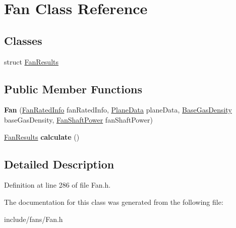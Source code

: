 \hypertarget{class_fan}{}\section{Fan Class Reference}
\label{class_fan}
\subsection*{Classes}
\begin{DoxyCompactItemize}
\item 
struct \hyperlink{struct_fan_1_1_fan_results}{Fan\+Results}
\end{DoxyCompactItemize}
\subsection*{Public Member Functions}
\begin{DoxyCompactItemize}
\item 
\mbox{\label{class_fan_a95fdcf17dfae2f251516b74280b2b18d}} 
{\bfseries Fan} (\hyperlink{class_fan_rated_info}{Fan\+Rated\+Info} fan\+Rated\+Info, \hyperlink{class_plane_data}{Plane\+Data} plane\+Data, \hyperlink{class_base_gas_density}{Base\+Gas\+Density} base\+Gas\+Density, \hyperlink{class_fan_shaft_power}{Fan\+Shaft\+Power} fan\+Shaft\+Power)
\item 
\mbox{\label{class_fan_a21d0f021a25b2175ee7539c97bcab44d}} 
\hyperlink{struct_fan_1_1_fan_results}{Fan\+Results} {\bfseries calculate} ()
\end{DoxyCompactItemize}


\subsection{Detailed Description}


Definition at line 286 of file Fan.\+h.



The documentation for this class was generated from the following file\+:\begin{DoxyCompactItemize}
\item 
include/fans/Fan.\+h\end{DoxyCompactItemize}

